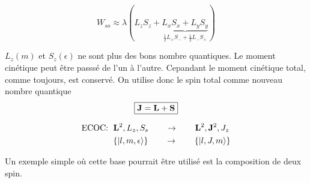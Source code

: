 \documentclass{article}
\begin{document}
$$W_{so} \approx \lambda(L_z S_z + \underbrace{L_xS_x + L_yS_y}_{\frac12L_+S_- +\frac{1}{2}L_-S_+})$$

$L_z(m)$ et $S_z(\epsilon)$ ne sont plus des bons nombre quantiques. Le moment cinétique peut être passsé de l'un à l'autre. Cepandant le moment cinétique total, comme toujours, est conservé. On utilise donc le spin total comme nouveau nombre quantique $$\boxed{\vb J = \vb L + \vb S}$$

\begin{align*}
	\text{ECOC: }\;
	&\vb L^2, L_z, S_s \qquad\to\qquad \vb L^2, \vb J^2, J_z\\
	&\qty{\ket{l,m,\epsilon}} \qquad\to\qquad \qty{\ket{l,J,m}}
\end{align*}

Un exemple simple où cette base pourrait être utilisé est la composition de deux spin.
\end{document}
